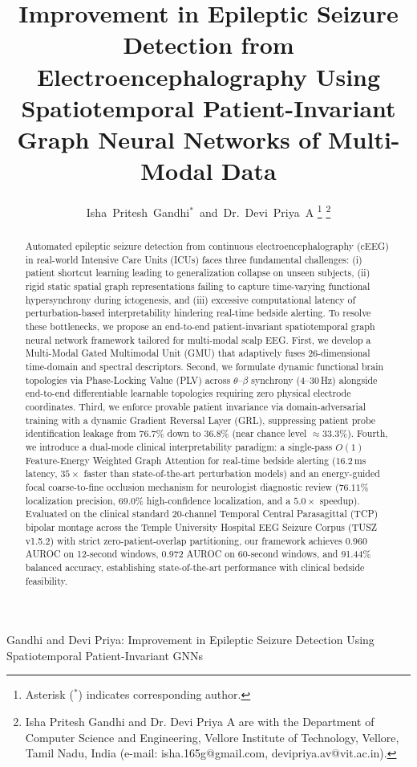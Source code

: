 \documentclass[journal]{IEEEtran}
\begin{document}
\title{Improvement in Epileptic Seizure Detection from Electroencephalography Using Spatiotemporal Patient-Invariant Graph Neural Networks of Multi-Modal Data}

\author{Isha~Pritesh~Gandhi$^{*}$~and~Dr.~Devi~Priya~A%
\thanks{Asterisk ($^{*}$) indicates corresponding author.}%
\thanks{Isha Pritesh Gandhi and Dr. Devi Priya A are with the Department of Computer Science and Engineering, Vellore Institute of Technology, Vellore, Tamil Nadu, India (e-mail: isha.165g@gmail.com, devipriya.av@vit.ac.in).}%
}

%
{Gandhi and Devi Priya: Improvement in Epileptic Seizure Detection Using Spatiotemporal Patient-Invariant GNNs}

\maketitle

\begin{abstract}
Automated epileptic seizure detection from continuous electroencephalography (cEEG) in real-world Intensive Care Units (ICUs) faces three fundamental challenges: (i) patient shortcut learning leading to generalization collapse on unseen subjects, (ii) rigid static spatial graph representations failing to capture time-varying functional hypersynchrony during ictogenesis, and (iii) excessive computational latency of perturbation-based interpretability hindering real-time bedside alerting. To resolve these bottlenecks, we propose an end-to-end patient-invariant spatiotemporal graph neural network framework tailored for multi-modal scalp EEG. First, we develop a Multi-Modal Gated Multimodal Unit (GMU) that adaptively fuses 26-dimensional time-domain and spectral descriptors. Second, we formulate dynamic functional brain topologies via Phase-Locking Value (PLV) across $\theta$--$\beta$ synchrony (4--30\,Hz) alongside end-to-end differentiable learnable topologies requiring zero physical electrode coordinates. Third, we enforce provable patient invariance via domain-adversarial training with a dynamic Gradient Reversal Layer (GRL), suppressing patient probe identification leakage from 76.7\% down to 36.8\% (near chance level $\approx 33.3\%$). Fourth, we introduce a dual-mode clinical interpretability paradigm: a single-pass $O(1)$ Feature-Energy Weighted Graph Attention for real-time bedside alerting ($16.2$\,ms latency, $35\times$ faster than state-of-the-art perturbation models) and an energy-guided focal coarse-to-fine occlusion mechanism for neurologist diagnostic review ($76.11\%$ localization precision, $69.0\%$ high-confidence localization, and a $5.0\times$ speedup). Evaluated on the clinical standard 20-channel Temporal Central Parasagittal (TCP) bipolar montage across the Temple University Hospital EEG Seizure Corpus (TUSZ v1.5.2) with strict zero-patient-overlap partitioning, our framework achieves 0.960 AUROC on 12-second windows, 0.972 AUROC on 60-second windows, and 91.44\% balanced accuracy, establishing state-of-the-art performance with clinical bedside feasibility.
\end{abstract}
\end{document}
